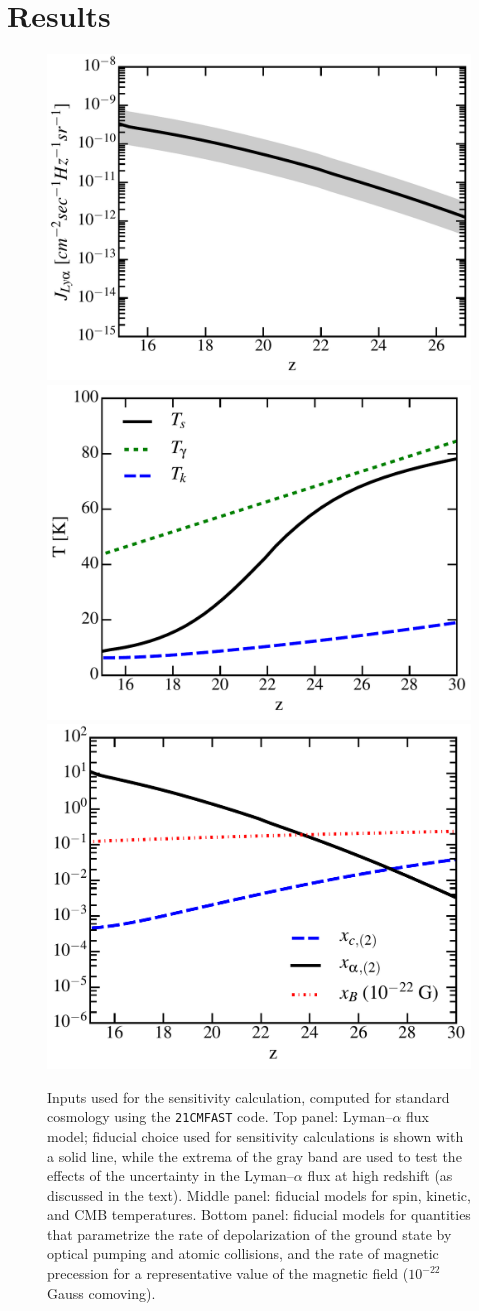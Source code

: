 \documentclass[aps,prd,twocolumn,floatfix,showpacs,superscriptaddress,nofootinbib]{revtex4-1}
\begin{document}
\section{Results}
\label{sec:results}
\begin{figure}
\centering
\includegraphics[width=.4\textwidth,keepaspectratio=true]{Jlya.pdf}
\includegraphics[width=.4\textwidth,keepaspectratio=true]{Ts.pdf}
\includegraphics[width=.4\textwidth,keepaspectratio=true]{xs.pdf}
\caption{Inputs used for the sensitivity calculation, computed for standard cosmology using the \texttt{21CMFAST} code. Top panel: Lyman--$\alpha$ flux model; fiducial choice used for sensitivity calculations is shown with a solid line, while the extrema of the gray band are used to test the effects of the uncertainty in the Lyman--$\alpha$ flux at high redshift (as discussed in the text). Middle panel: fiducial models for spin, kinetic, and CMB temperatures. Bottom panel: fiducial models for quantities that parametrize the rate of depolarization of the ground state by optical pumping and atomic collisions, and the rate of magnetic precession for a representative value of the magnetic field ($10^{-22}$ Gauss comoving). \label{fig:cosmo}}
\end{figure}
\end{document}
